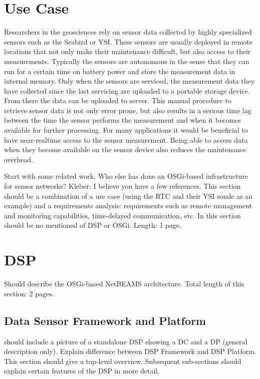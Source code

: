 \documentclass[conference]{IEEEtran}
\begin{document}
\section{Use Case}

Researchers in the geosciences rely on sensor data collected by highly
specialized sensors such as the Seabird or YSI. These sensors are
usually deployed in remote locations that not only make their
maintenance difficult, but also access to their measurements.
Typically the sensors are autonomous in the sense that they can run
for a certain time on battery power and store the measurement data in
internal memory. Only when the sensors are serviced, the measurement
data they have collected since the last servicing are uploaded to a
portable storage device. From there the data can be uploaded to
server. This manual procedure to retrieve sensor data is not only
error prone, but also results in a serious time lag between the time
the sensor performs the measurement and when it becomes available for
further processing. For many applications it would be beneficial to
have near-realtime access to the sensor measurement. Being able to
access data when they become available on the sensor device also
reduces the maintenance overhead.

Start with some related work. Who else has done an OSGi-based
infrastructure for sensor networks? Kleber: I believe you have a few
references. This section should be a combination of a use case (using
the RTC and their YSI sonde as an example) and a requirements
analysis: requirements such as remote management and monitoring
capabilities, time-delayed communication, etc. In this section should
be no mentioned of DSP or OSGi. Length: 1 page.

\section{DSP}

Should describe the OSGi-based NetBEAMS architecture. Total length of
this section: 2 pages.

\subsection{Data Sensor Framework and Platform}

should include a picture of a standalone DSP showing a DC and a DP
(general description only). Explain difference between DSP Framework
and DSP Platform. This section should give a top-level overview.
Subsequent sub-sections should explain certain features of the DSP in
more detail.
\end{document}
